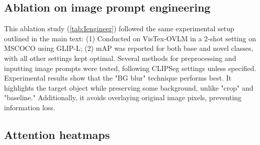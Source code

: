 \subsection{Ablation on image prompt engineering}
\begin{table}[t]
    \centering
    \caption{Ablation on image prompt engineering methods. “Baseline” indicates directly inputting the original image. "crop" means cropping out the target region based on ground truth bounding box while "crop large context" enlarges ground truth bounding box by $k=10$ pixels. "BG blur" technique applies a shadow (intensity of 0.1) and Gaussian noise (kernel size of 15 and a standard deviation of 3) to the background area. Best results are marked in \textbf{bold}.}
    \label{tab:Iengineer}
\end{table}

This ablation study (\cref{tab:Iengineer}) followed the same experimental setup outlined in the main text: (1) Conducted on VisTex-OVLM in a 2-shot setting on MSCOCO using GLIP-L; (2) mAP was reported for both base and novel classes, with all other settings kept optimal. Several methods for preprocessing and inputting image prompts were tested, following CLIPSeg \cite{luddecke2022clipseg} settings unless specified. Experimental results show that the "BG blur" technique performs best. It highlights the target object while preserving some background, unlike "crop" and "baseline." Additionally, it avoids overlaying original image pixels, preventing information loss.

\subsection{Attention heatmaps}

